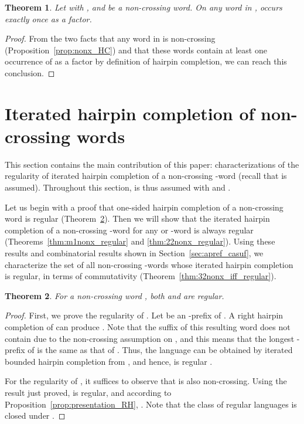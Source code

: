 \documentclass{article}
\theoremstyle{plain}
\newtheorem{theorem}{Theorem}
\theoremstyle{remark}
\begin{document}
\begin{theorem}\label{thm:nonx_initial_once}
	Let  with , and  be a non-crossing word. 
	On any word in ,  occurs exactly once as a factor. 
\end{theorem}
\begin{proof}
	From the two facts that any word in  is non-crossing (Proposition~\ref{prop:nonx_HC}) and that these words contain at least one occurrence of  as a factor by definition of hairpin completion, we can reach this conclusion. 
\end{proof}


\section{Iterated hairpin completion of non-crossing words}

This section contains the main contribution of this paper: characterizations of the regularity of iterated hairpin completion of a non-crossing -word  (recall that  is assumed). 
Throughout this section,  is thus assumed with  and . 

Let us begin with a proof that one-sided hairpin completion of a non-crossing word is regular (Theorem~\ref{thm:nonx_oneside_regular}). 
Then we will show that the iterated hairpin completion of a non-crossing -word for any  or -word is always regular (Theorems~\ref{thm:m1nonx_regular} and \ref{thm:22nonx_regular}). 
Using these results and combinatorial results shown in Section~\ref{sec:apref_casuf}, we characterize the set of all non-crossing -words whose iterated hairpin completion is regular, in terms of commutativity (Theorem~\ref{thm:32nonx_iff_regular}). 

\begin{theorem}\label{thm:nonx_oneside_regular}
	For a non-crossing word , both  and  are regular. 
\end{theorem}
\begin{proof}
	First, we prove the regularity of . 
	Let  be an -prefix of . 
	A right hairpin completion of  can produce . 
	Note that the suffix  of this resulting word does not contain  due to the non-crossing assumption on , and this means that the longest -prefix of  is the same as that of . 
	Thus, the language  can be obtained by iterated bounded hairpin completion from , and hence, is regular \cite{Kopecki10}. 

	For the regularity of , it suffices to observe that  is also non-crossing. 
	Using the result just proved,  is regular, and according to Proposition~\ref{prop:presentation_RH}, . 
	Note that the class of regular languages is closed under . 
\end{proof}
\end{document}

